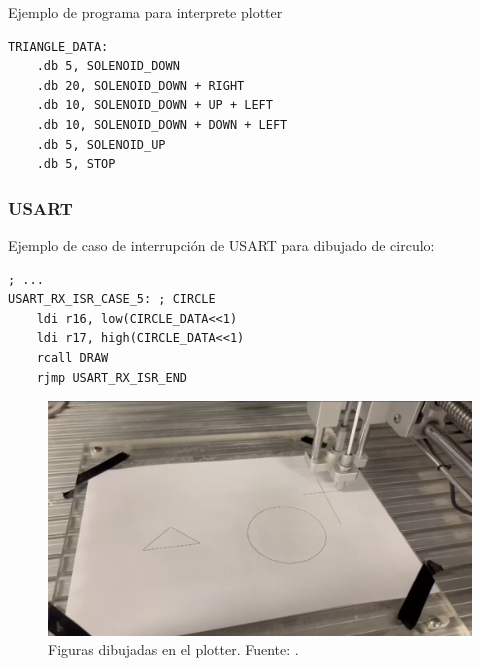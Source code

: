 Ejemplo de programa para interprete plotter
\begin{verbatim}
TRIANGLE_DATA:
    .db 5, SOLENOID_DOWN	
    .db 20, SOLENOID_DOWN + RIGHT			
    .db 10, SOLENOID_DOWN + UP + LEFT		
    .db 10, SOLENOID_DOWN + DOWN + LEFT
    .db 5, SOLENOID_UP		
    .db 5, STOP
\end{verbatim}

\subsubsection{USART}
Ejemplo de caso de interrupción de USART para dibujado de circulo:
\begin{verbatim}
; ...
USART_RX_ISR_CASE_5: ; CIRCLE
    ldi r16, low(CIRCLE_DATA<<1) 
    ldi r17, high(CIRCLE_DATA<<1)
    rcall DRAW
    rjmp USART_RX_ISR_END
\end{verbatim}

\begin{figure}[H]
  \centering
  \includegraphics[width=\linewidth]{./Anexos/Resultados/Plotter/Dibujos.jpg}
  \caption{Figuras dibujadas en el plotter. Fuente: \cite{LabDrive}.}
  \label{fig:plotter_figuras}
\end{figure}